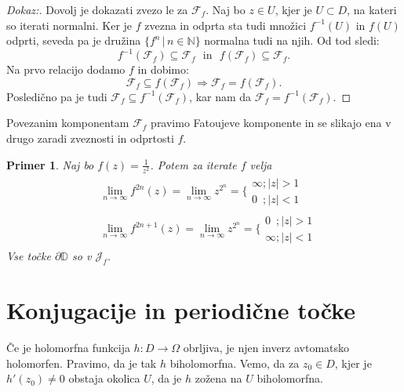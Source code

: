 \documentclass{article}
\newtheorem{primer}{Primer}
\newcommand{\D}{\mathbb{D}}
\newcommand{\N}{\mathbb{N}}
\newcommand{\F}{\mathcal{F}}
\begin{document}
\begin{proof}[Dokaz:]
Dovolj je dokazati zvezo le za $\F_f$. Naj bo $z\in U$, kjer je 
$U \subset D$, na kateri so iterati normalni. Ker je $f$ zvezna 
in odprta sta tudi množici $f^{-1}(U)$ in $f(U)$ odprti, 
seveda pa je družina $\{f^n \,|\, n\in \N\}$ normalna tudi na 
njih. Od tod sledi:
$$
f^{-1}(\F_f) \subseteq \F_f \,\,\text{ in } \,\,f(\F_f) \subseteq \F_f.
$$
Na prvo relacijo dodamo $f$ in dobimo:
$$
\F_f \subseteq f(\F_f) \Longrightarrow \F_f = f(\F_f).
$$
Posledično pa je tudi $\F_f \subseteq f^{-1}(\F_f)$, kar nam da $\F_f = f^{-1}(\F_f)$.
\end{proof}
\noindent
Povezanim komponentam $\F_f$ pravimo Fatoujeve komponente in se slikajo ena v drugo 
zaradi zveznosti in odprtosti $f$.

\begin{primer}
    Naj bo $f(z) = \frac{1}{z^2}$. Potem za iterate $f$ velja 
    \begin{align*}
    &\lim_{n\rightarrow \infty} f^{2n}(z) = \lim_{n\rightarrow \infty} z^{2^n} = 
    \Big\{\begin{array}{l}
        \infty; |z| > 1 \\
        0\,\,\,; |z| < 1
    \end{array} \\
    &\lim_{n\rightarrow \infty} f^{2n+1}(z) = \lim_{n\rightarrow \infty} z^{2^n} = 
    \Big\{\begin{array}{l}
        0\,\,\,; |z| > 1 \\
        \infty; |z| < 1
    \end{array}
\end{align*}
Vse točke $\partial \D$ so v $\mathcal{J}_f$.
\end{primer}

\section{Konjugacije in periodične točke}
Če je holomorfna funkcija $h: D \rightarrow \Omega$ obrljiva, je 
njen inverz avtomatsko holomorfen. Pravimo, da je tak $h$ biholomorfna. 
Vemo, da za $z_0 \in D$, kjer je $h'(z_0) \neq 0$ obstaja okolica $U$, 
da je $h$ zožena na $U$ biholomorfna.
\end{document}
